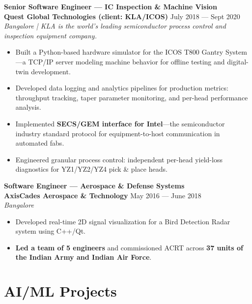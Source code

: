\documentclass[11pt,a4paper]{article}
\newcommand{\jobtitle}[4]{%
    \noindent\textbf{#1}\\
    \textbf{#2} \hfill #3\\
    \textit{#4}\par\vspace{2pt}
}
\begin{document}
\jobtitle{Senior Software Engineer --- IC Inspection \& Machine Vision}{Quest Global Technologies (client: KLA/ICOS)}{July 2018 --- Sept 2020}{Bangalore | KLA is the world's leading semiconductor process control and inspection equipment company.}
\begin{itemize}[leftmargin=*, nosep, topsep=2pt]
    \item Built a Python-based hardware simulator for the ICOS T800 Gantry System---a TCP/IP server modeling machine behavior for offline testing and digital-twin development.
    \item Developed data logging and analytics pipelines for production metrics: throughput tracking, taper parameter monitoring, and per-head performance analysis.
    \item Implemented \textbf{SECS/GEM interface for Intel}---the semiconductor industry standard protocol for equipment-to-host communication in automated fabs.
    \item Engineered granular process control: independent per-head yield-loss diagnostics for YZ1/YZ2/YZ4 pick \& place heads.
\end{itemize}

\jobtitle{Software Engineer --- Aerospace \& Defense Systems}{AxisCades Aerospace \& Technology}{May 2016 --- June 2018}{Bangalore}
\begin{itemize}[leftmargin=*, nosep, topsep=2pt]
    \item Developed real-time 2D signal visualization for a Bird Detection Radar system using C++/Qt.
    \item \textbf{Led a team of 5 engineers} and commissioned ACRT across \textbf{37 units of the Indian Army and Indian Air Force}.
\end{itemize}

\section{AI/ML Projects}
\end{document}
